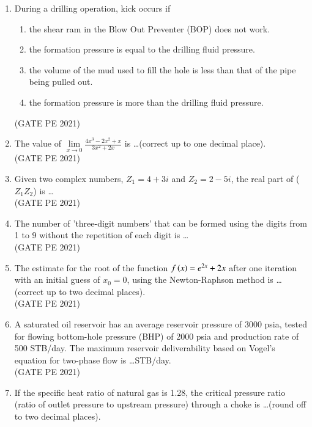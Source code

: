 \documentclass[journal,12pt,onecolumn]{IEEEtran}
\theoremstyle{remark}
\begin{document}
\begin{enumerate}
\item During a drilling operation, kick occurs if
\begin{enumerate}
    \item the shear ram in the Blow Out Preventer (BOP) does not work.
    \item the formation pressure is equal to the drilling fluid pressure.
    \item the volume of the mud used to fill the hole is less than that of the pipe being pulled out.
    \item the formation pressure is more than the drilling fluid pressure.
\end{enumerate}
\hfill{(GATE PE 2021)}

\item The value of $\lim\limits_{x \to 0} \frac{4x^3-2x^2+x}{3x^2+2x}$ is \dots(correct up to one decimal place).\\

\hfill{(GATE PE 2021)}

\item Given two complex numbers, $Z_1=4+3i$ and $Z_2=2-5i$, the real part of ($Z_1Z_2$) is \dots\\

\hfill{(GATE PE 2021)}

\item The number of 'three-digit numbers' that can be formed using the digits from 1 to 9 without the repetition of each digit is \dots\\

\hfill{(GATE PE 2021)}

\item The estimate for the root of the function $f\left(x\right)=e^{2x}+2x$ after one iteration with an initial guess of $x_0=0$, using the Newton-Raphson method is \dots(correct up to two decimal places).\\

\hfill{(GATE PE 2021)}

\item A saturated oil reservoir has an average reservoir pressure of 3000 psia, tested for flowing bottom-hole pressure (BHP) of 2000 psia and production rate of 500 STB/day. The maximum reservoir deliverability based on Vogel's equation for two-phase flow is \dots  STB/day.\\

\hfill{(GATE PE 2021)}

\item If the specific heat ratio of natural gas is 1.28, the critical pressure ratio (ratio of outlet pressure to upstream pressure) through a choke is \dots (round off to two decimal places).\\


\end{enumerate}
\end{document}
